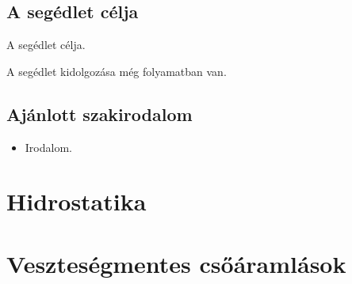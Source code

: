 \documentclass[11pt, a4paper]{report}
\begin{document}
\section*{A segédlet célja}

A segédlet célja.

A segédlet kidolgozása még folyamatban van.


\section*{Ajánlott szakirodalom}

\begin{itemize}
	\item Irodalom.
\end{itemize}


\chapter{Hidrostatika}












































\chapter{Veszteségmentes csőáramlások}



\end{document}
